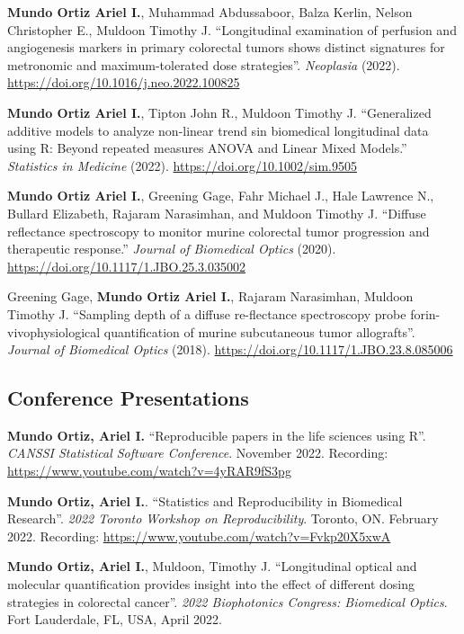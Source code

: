 \documentclass[10pt,]{article}
\begin{document}
\textbf{Mundo Ortiz Ariel I.}, Muhammad Abdussaboor, Balza Kerlin,
Nelson Christopher E., Muldoon Timothy J. ``Longitudinal examination of
perfusion and angiogenesis markers in primary colorectal tumors shows
distinct signatures for metronomic and maximum-tolerated dose
strategies''. \emph{Neoplasia} (2022).
\url{https://doi.org/10.1016/j.neo.2022.100825}

\textbf{Mundo Ortiz Ariel I.}, Tipton John R., Muldoon Timothy J.
``Generalized additive models to analyze non-linear trend sin biomedical
longitudinal data using R: Beyond repeated measures ANOVA and Linear
Mixed Models.'' \emph{Statistics in Medicine} (2022).
\url{https://doi.org/10.1002/sim.9505}

\textbf{Mundo Ortiz Ariel I.}, Greening Gage, Fahr Michael J., Hale
Lawrence N., Bullard Elizabeth, Rajaram Narasimhan, and Muldoon Timothy
J. ``Diffuse reflectance spectroscopy to monitor murine colorectal tumor
progression and therapeutic response.'' \emph{Journal of Biomedical
Optics} (2020). \url{https://doi.org/10.1117/1.JBO.25.3.035002}

Greening Gage, \textbf{Mundo Ortiz Ariel I.}, Rajaram Narasimhan,
Muldoon Timothy J. ``Sampling depth of a diffuse re-flectance
spectroscopy probe forin-vivophysiological quantification of murine
subcutaneous tumor allografts''. \emph{Journal of Biomedical Optics}
(2018). \url{https://doi.org/10.1117/1.JBO.23.8.085006}

\subsection{Conference Presentations}\label{conference-presentations}

\textbf{Mundo Ortiz, Ariel I.} ``Reproducible papers in the life
sciences using R''. \emph{CANSSI Statistical Software Conference}.
November 2022. Recording:
\url{https://www.youtube.com/watch?v=4yRAR9fS3pg}

\textbf{Mundo Ortiz, Ariel I.}. ``Statistics and Reproducibility in
Biomedical Research''. \emph{2022 Toronto Workshop on Reproducibility}.
Toronto, ON. February 2022. Recording:
\url{https://www.youtube.com/watch?v=Fvkp20X5xwA}

\textbf{Mundo Ortiz, Ariel I.}, Muldoon, Timothy J. ``Longitudinal
optical and molecular quantification provides insight into the effect of
different dosing strategies in colorectal cancer''. \emph{2022
Biophotonics Congress: Biomedical Optics}. Fort Lauderdale, FL, USA,
April 2022.
\end{document}

